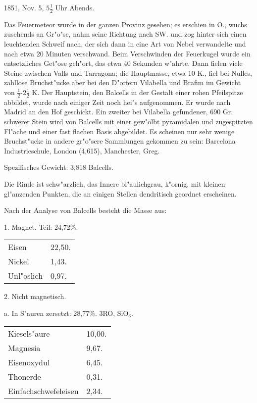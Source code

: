 \documentclass[a4paper, 11pt, oneside]{article}
\begin{document}
1851, Nov. 5, $5\frac{1}{2}$ Uhr Abends.

Das Feuermeteor wurde in der ganzen Provinz gesehen; es erschien in O., wuchs zusehends an Gr"o"se, nahm seine Richtung nach SW. und zog hinter sich einen leuchtenden Schweif nach, der sich dann in eine Art von Nebel verwandelte und nach etwa 20 Minuten verschwand. Beim Verschwinden der Feuerkugel wurde ein entsetzliches Get"ose geh"ort, das etwa 40 Sekunden w"ahrte. Dann fielen viele Steine zwischen Valls und Tarragona; die Hauptmasse, etwa 10 K., fiel bei Nulles, zahllose Bruchst"ucke aber bei den D"orfern Vilabella und Brafim im Gewicht von $\frac{1}{2}$-$2\frac{1}{2}$ K. Der Hauptstein, den Balcells in der Gestalt einer rohen Pfeilspitze abbildet, wurde nach einiger Zeit noch hei"s aufgenommen. Er wurde nach Madrid an den Hof geschickt. Ein zweiter bei Vilabella gefundener, 690 Gr. schwerer Stein wird von Balcells mit einer gew"olbt pyramidalen und zugespitzten Fl"ache und einer fast flachen Basis abgebildet. Es scheinen nur sehr wenige Bruchst"ucke in andere gr"o"sere Sammlungen gekommen zu sein: Barcelona Industrieschule, London (4,615), Manchester, Greg.

Spezifisches Gewicht: 3,818 Balcells.

Die Rinde ist schw"arzlich, das Innere bl"aulichgrau, k"ornig, mit kleinen gl"anzenden Punkten, die an einigen Stellen dendritisch geordnet erscheinen.

Nach der Analyse von Balcells besteht die Masse aus:
\begin{center}
1. Magnet. Teil: 24,72\%.
\end{center}

\begin{table}[H]
    \centering
    \begin{tabular}{l l}
    \hline
        Eisen & 22,50. \\
        Nickel & 1,43. \\
        Unl"oslich & 0,97. \\
    \end{tabular}
\end{table}

\begin{center}
2. Nicht magnetisch.
\end{center}

\begin{center}
a. In S"auren zersetzt: 28,77\%. 3RO, SiO$_{3}$.
\end{center}

\begin{table}[H]
    \centering
    \begin{tabular}{l l}
    \hline
        Kiesels"aure & 10,00. \\
        Magnesia & 9,67. \\
        Eisenoxydul & 6,45. \\
        Thonerde & 0,31. \\
        Einfachschwefeleisen & 2,34. \\
    \end{tabular}
\end{table}
\end{document}
